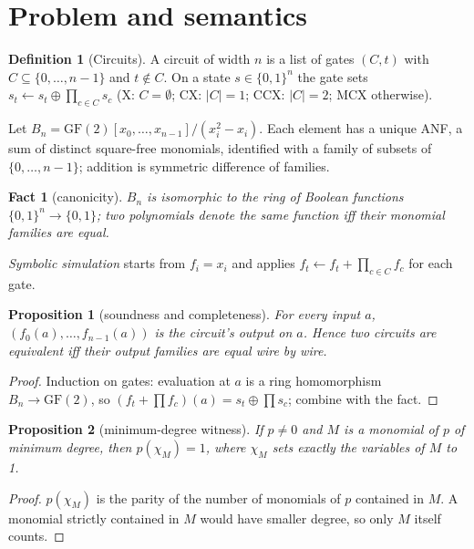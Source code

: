 \documentclass[10pt,a4paper]{article}
\newtheorem{proposition}{Proposition}
\newtheorem{fact}{Fact}
\theoremstyle{definition}
\newtheorem{definition}{Definition}
\newcommand{\GF}{\mathrm{GF}(2)}
\begin{document}
\section{Problem and semantics}\label{sec:problem}

\begin{definition}[Circuits]
A circuit of width $n$ is a list of gates $(C,t)$ with $C\subseteq\{0,\dots,n-1\}$ and
$t\notin C$. On a state $s\in\{0,1\}^n$ the gate sets $s_t\leftarrow s_t\oplus\prod_{c\in C}s_c$
(X: $C=\emptyset$; CX: $|C|=1$; CCX: $|C|=2$; MCX otherwise).
\end{definition}

Let $B_n=\GF[x_0,\dots,x_{n-1}]/(x_i^2-x_i)$. Each element has a unique ANF, a sum of distinct
square-free monomials, identified with a family of subsets of $\{0,\dots,n-1\}$; addition is
symmetric difference of families.

\begin{fact}[canonicity]
$B_n$ is isomorphic to the ring of Boolean functions $\{0,1\}^n\to\{0,1\}$; two polynomials
denote the same function iff their monomial families are equal.
\end{fact}

\emph{Symbolic simulation} starts from $f_i=x_i$ and applies $f_t\leftarrow f_t+\prod_{c\in
C}f_c$ for each gate.

\begin{proposition}[soundness and completeness]
For every input $a$, $(f_0(a),\dots,f_{n-1}(a))$ is the circuit's output on $a$. Hence two
circuits are equivalent iff their output families are equal wire by wire.
\end{proposition}
\begin{proof}
Induction on gates: evaluation at $a$ is a ring homomorphism $B_n\to\GF$, so
$(f_t+\prod f_c)(a)=s_t\oplus\prod s_c$; combine with the fact.
\end{proof}

\begin{proposition}[minimum-degree witness]\label{prop:witness}
If $p\neq 0$ and $M$ is a monomial of $p$ of minimum degree, then $p(\chi_M)=1$, where
$\chi_M$ sets exactly the variables of $M$ to 1.
\end{proposition}
\begin{proof}
$p(\chi_M)$ is the parity of the number of monomials of $p$ contained in $M$. A monomial
strictly contained in $M$ would have smaller degree, so only $M$ itself counts.
\end{proof}
\end{document}
